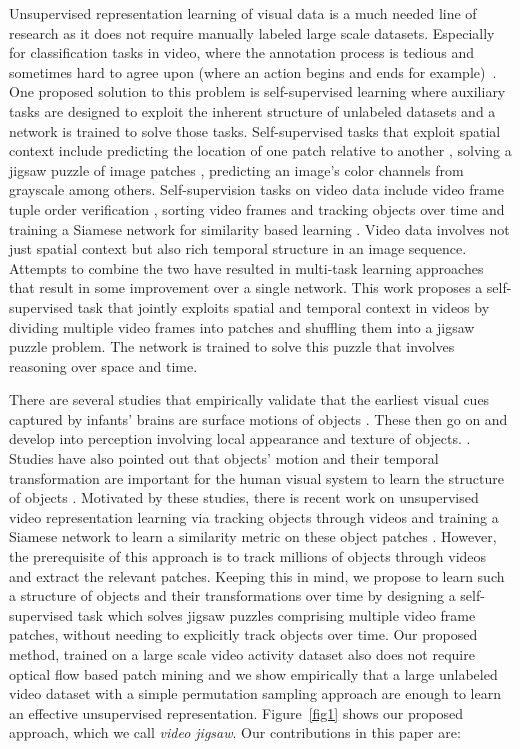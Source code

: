 \documentclass[10pt,twocolumn,letterpaper]{article}
\begin{document}
Unsupervised representation learning of visual data is a much needed line of research as it does not require manually labeled large scale datasets. Especially for classification tasks in video, where the annotation process is tedious and sometimes hard to agree upon (where an action begins and ends for example)~\cite{sigurdsson2017actions}. One proposed solution to this problem is self-supervised learning where auxiliary tasks are designed to exploit the inherent structure of unlabeled datasets and a network is trained to solve those tasks. Self-supervised tasks that exploit spatial context include predicting the location of one patch relative to another \cite{doersch2015unsupervised}, solving a jigsaw puzzle of image patches \cite{noroozi2016unsupervised}, predicting an image's color channels from grayscale \cite{zhang2016colorful,larsson2016learning} among others. Self-supervision tasks on video data include video frame tuple order verification \cite{misra2016shuffle}, sorting video frames \cite{lee2017unsupervised} and tracking objects over time and training a Siamese network for similarity based learning \cite{wang2015unsupervised}. Video data involves not just spatial context but also rich temporal structure in an image sequence. Attempts to combine the two have resulted in multi-task learning approaches \cite{doersch2017multi} that result in some improvement over a single network. This work proposes a self-supervised task that jointly exploits spatial and temporal context in videos by dividing multiple video frames into patches and shuffling them into a jigsaw puzzle problem. The network is trained to solve this puzzle that involves reasoning over space and time.

There are several studies that empirically validate that the earliest visual cues captured by infants' brains are surface motions of objects \cite{spelke1990principles}. These then go on and develop into perception involving local appearance and texture of objects. \cite{spelke1990principles}. Studies have also pointed out that objects' motion and their temporal transformation are important for the human visual system to learn the structure of objects \cite{foldiak1991learning,wiskott2002slow}. Motivated by these studies, there is recent work on unsupervised video representation learning via tracking objects through videos and training a Siamese network to learn a similarity metric on these object patches \cite{wang2015unsupervised}. However, the prerequisite of this approach is to track millions of objects through videos and extract the relevant patches. Keeping this in mind, we propose to learn such a structure of objects and their transformations over time by designing a self-supervised task which solves jigsaw puzzles comprising multiple video frame patches, without needing to explicitly track objects over time. Our proposed method, trained on a large scale video activity dataset also does not require optical flow based patch mining and we show empirically that a large unlabeled video dataset with a simple permutation sampling approach are enough to learn an effective unsupervised representation. Figure~\ref{fig1} shows our proposed approach, which we call \textit{video jigsaw}. Our contributions in this paper are:
\vspace{-2mm}
\end{document}
